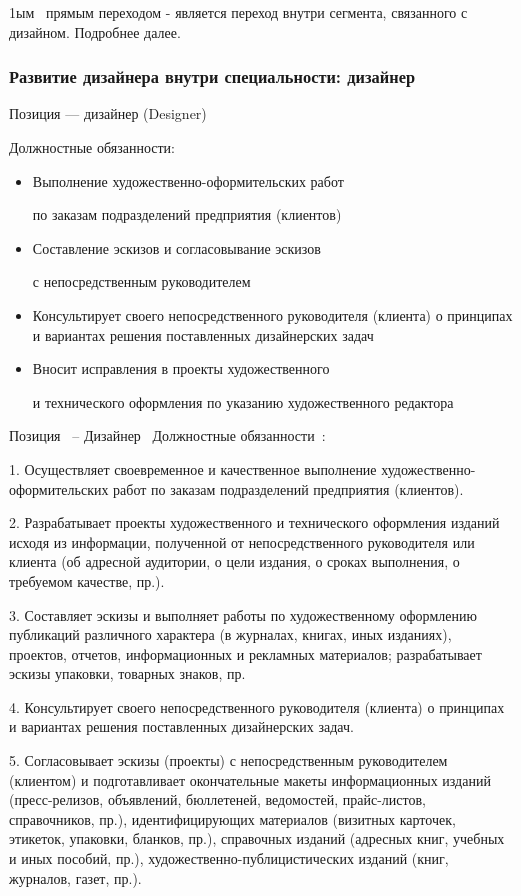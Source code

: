 \documentclass{../industrial-development}
\begin{document}
\lecturenotes

 1ым~\cite{mc} прямым переходом  - является переход внутри сегмента, связанного с дизайном. Подробнее далее.

\begin{frame} \frametitle{Развитие дизайнера внутри специальности: дизайнер }
 \begin{block}{}
  \alert{Позиция --- дизайнер (Designer)}

Должностные обязанности: 
  \end{block}
  \begin{itemize}
  \item  Выполнение художественно-оформительских работ 

по заказам подразделений предприятия (клиентов)
  \item  Составление эскизов и согласовывание эскизов 

с непосредственным руководителем 
  \item Консультирует своего непосредственного руководителя (клиента) о принципах и вариантах решения поставленных дизайнерских задач
 \item  Вносит исправления в проекты художественного 

и технического оформления по указанию художественного редактора
  \end{itemize}
\end{frame}

\lecturenotes

Позиция~\cite{hh} – Дизайнер~\cite{itcf}
Должностные обязанности~\cite{rab}:

1.	Осуществляет своевременное и качественное выполнение художественно-оформительских работ по заказам подразделений предприятия (клиентов).

2.	Разрабатывает проекты художественного и технического оформления изданий исходя из информации, полученной от непосредственного руководителя или клиента (об адресной аудитории, о цели издания, о сроках выполнения, о требуемом качестве, пр.).

3.	Составляет эскизы и выполняет работы по художественному оформлению публикаций различного характера (в журналах, книгах, иных изданиях), проектов, отчетов, информационных и рекламных материалов; разрабатывает эскизы упаковки, товарных знаков, пр.

4.	Консультирует своего непосредственного руководителя (клиента) о принципах и вариантах решения поставленных дизайнерских задач.

5.	Согласовывает эскизы (проекты) с непосредственным руководителем (клиентом) и подготавливает окончательные макеты информационных изданий (пресс-релизов, объявлений, бюллетеней, ведомостей, прайс-листов, справочников, пр.), идентифицирующих материалов (визитных карточек, этикеток, упаковки, бланков, пр.), справочных изданий (адресных книг, учебных и иных пособий, пр.), художественно-публицистических изданий (книг, журналов, газет, пр.).
\end{document}

